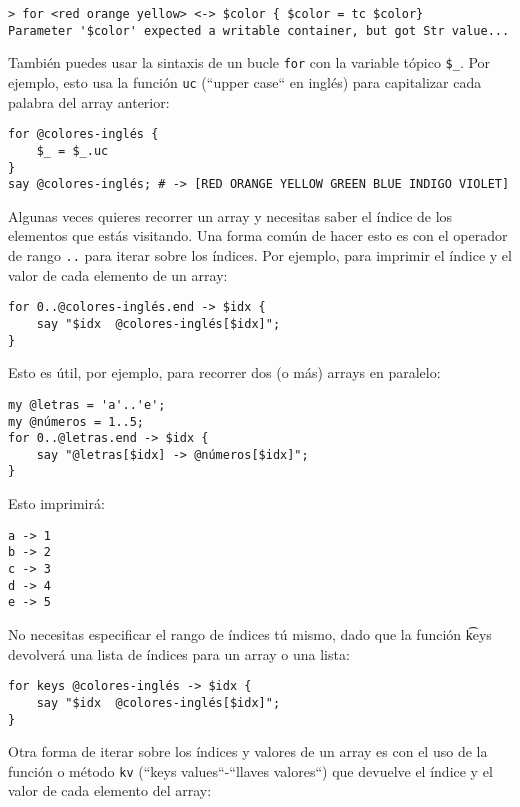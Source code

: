 \begin{verbatim}
> for <red orange yellow> <-> $color { $color = tc $color}
Parameter '$color' expected a writable container, but got Str value...
\end{verbatim}

También puedes usar la sintaxis de un bucle {\tt for}
con la variable tópico \verb|$_|. Por ejemplo, esto usa la 
función {\tt uc} (``upper case`` en inglés) para 
capitalizar cada palabra del array anterior:

\begin{verbatim}
for @colores-inglés { 
    $_ = $_.uc 
}
say @colores-inglés; # -> [RED ORANGE YELLOW GREEN BLUE INDIGO VIOLET]
\end{verbatim}
%

Algunas veces quieres recorrer un array y necesitas saber
el índice de los elementos que estás visitando. Una forma
común de hacer esto es con el operador de rango \verb|..|
para iterar sobre los índices. Por ejemplo, para imprimir 
el índice y el valor de cada elemento de un array:

\begin{verbatim}
for 0..@colores-inglés.end -> $idx { 
    say "$idx  @colores-inglés[$idx]"; 
}
\end{verbatim}

Esto es útil, por ejemplo, para recorrer dos (o más) arrays
en paralelo:

\begin{verbatim}
my @letras = 'a'..'e';
my @números = 1..5;
for 0..@letras.end -> $idx { 
    say "@letras[$idx] -> @números[$idx]"; 
}
\end{verbatim}
%

Esto imprimirá:
\begin{verbatim}
a -> 1
b -> 2
c -> 3
d -> 4
e -> 5
\end{verbatim}

No necesitas especificar el rango de índices tú mismo, dado que
la función {\t keys} devolverá una lista de índices para un
array o una lista:

\begin{verbatim}
for keys @colores-inglés -> $idx { 
    say "$idx  @colores-inglés[$idx]"; 
}
\end{verbatim}

Otra forma de iterar sobre los índices y valores de un
array es con el uso de la función o método 
{\tt kv} (``keys values``-``llaves valores``) que
devuelve el índice y el valor de cada elemento del array:


